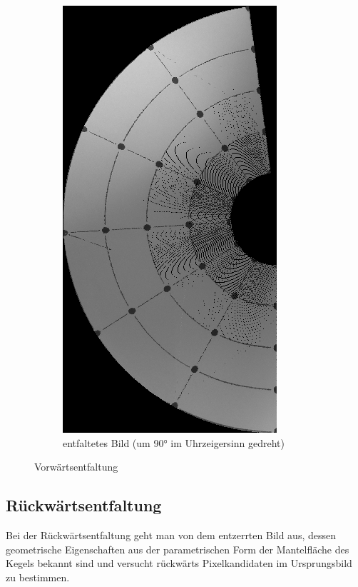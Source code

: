 \begin{figure}[!htb]
\begin{subfigure}{.5\textwidth}
		\includegraphics[angle=-90, width=.9\textwidth]{images/coneRaspUnWarpForward.png}
		\caption{entfaltetes Bild (um 90° im Uhrzeigersinn gedreht)}
	\end{subfigure}
	\caption{Vorwärtsentfaltung}
	\label{fig:forwardUnfold}
\end{figure}


\subsection{Rückwärtsentfaltung}
Bei der Rückwärtsentfaltung geht man von dem entzerrten Bild aus, dessen geometrische Eigenschaften aus der parametrischen Form der Mantelfläche des Kegels bekannt sind und versucht rückwärts Pixelkandidaten im Ursprungsbild zu bestimmen.

